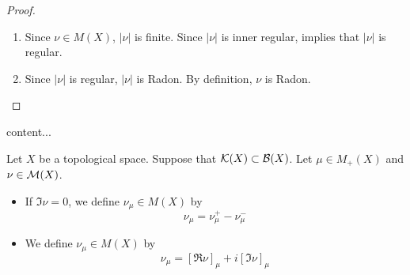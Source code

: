 \documentclass{book}
\begin{document}
\begin{proof}
\begin{enumerate}
\begin{itemize}
				\begin{align*}
					|\nu|(E \cap A) - |\nu|(K) 
					& = |\nu|[(E \cap A) \setminus K] \\
					& < \ep.
				\end{align*}
				Hence
				\begin{align*}
					|\nu|(E)
					& = |\nu|(E \cap A) + |\nu|(E \cap A^c) \\
					& = |\nu|(E \cap A) \\
					& < |\nu|(K) + \ep 
				\end{align*}
				so that 
				\begin{align*}
					\sup V_I(E)
					& \geq |\nu|(K) \\
					& > |\nu|(E) - \ep
				\end{align*}
			\end{itemize}
			Since $\ep > 0$ is arbitrary, we have that $\sup V_I(E) \geq |\nu|(E)$. Therefore $\sup V_I(E) = |\nu|(E)$ and $|\nu|$ is inner regular on $E$. Since $E \subset X$ with $E$ open is arbitrary, we have that $|\nu|$ is inner regular.
			\item Since $\nu \in M(X)$, $|\nu|$ is finite. Since $|\nu|$ is inner regular,  implies that $|\nu|$ is regular. 
			\item Since $|\nu|$ is regular, $|\nu|$ is Radon. By definition, $\nu$ is Radon.
		\end{enumerate}  
	\end{proof}
	
	
	\begin{ex}
		content...
	\end{ex}

	\begin{defn}
		Let $X$ be a topological space. Suppose that $\mathcal{K}(X) \subset \mathcal{B}(X)$. Let $\mu \in M_+(X)$ and $\nu \in \mathcal{M}(X)$. 
		\begin{itemize}
			\item If $\Im \nu = 0$, we define $\nu_{\mu} \in M(X)$ by 
			$$\nu_{\mu} = \nu^+_{\mu} - \nu^-_{\mu}$$
			\item We define $\nu_{\mu} \in M(X)$ by 
			$$\nu_{\mu} = [\Re \nu]_{\mu} + i [\Im \nu]_{\mu}$$
		\end{itemize}
	\end{defn}
	
\end{document}
